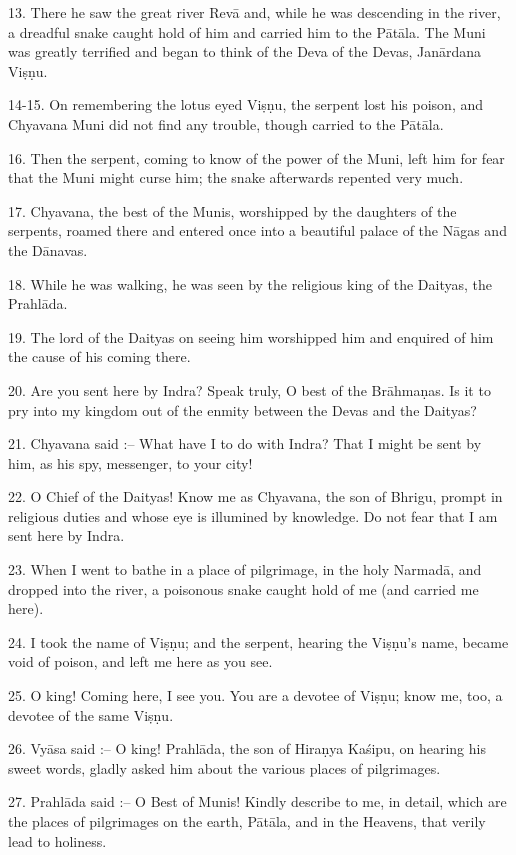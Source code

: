 13. There he saw the great river Rev\=a and, while he was descending in the river, a dreadful snake caught hold of him and carried him to the P\=at\=ala. The Muni was greatly terrified and began to think of the Deva of the Devas, Jan\=ardana Vi\d{s}\d{n}u.

14-15. On remembering the lotus eyed Vi\d{s}\d{n}u, the serpent lost his poison, and Chyavana Muni did not find any trouble, though carried to the P\=at\=ala.

16. Then the serpent, coming to know of the power of the Muni, left him for fear that the Muni might curse him; the snake afterwards repented very much.

17. Chyavana, the best of the Munis, worshipped by the daughters of the serpents, roamed there and entered once into a beautiful palace of the N\=agas and the D\=anavas.

18. While he was walking, he was seen by the religious king of the Daityas, the Prahl\=ada.

19. The lord of the Daityas on seeing him worshipped him and enquired of him the cause of his coming there.

20. Are you sent here by Indra? Speak truly, O best of the Br\=ahma\d{n}as. Is it to pry into my kingdom out of the enmity between the Devas and the Daityas?

21. Chyavana said :-- What have I to do with Indra? That I might be sent by him, as his spy, messenger, to your city!

22. O Chief of the Daityas! Know me as Chyavana, the son of Bhrigu, prompt in religious duties and whose eye is illumined by knowledge. Do not fear that I am sent here by Indra.

23. When I went to bathe in a place of pilgrimage, in the holy Narmad\=a, and dropped into the river, a poisonous snake caught hold of me (and carried me here).

24. I took the name of Vi\d{s}\d{n}u; and the serpent, hearing the Vi\d{s}\d{n}u's name, became void of poison, and left me here as you see.

25. O king! Coming here, I see you. You are a devotee of Vi\d{s}\d{n}u; know me, too, a devotee of the same Vi\d{s}\d{n}u.

26. Vy\=asa said :-- O king! Prahl\=ada, the son of Hira\d{n}ya Ka\'sipu, on hearing his sweet words, gladly asked him about the various places of pilgrimages.

27. Prahl\=ada said :-- O Best of Munis! Kindly describe to me, in detail, which are the places of pilgrimages on the earth, P\=at\=ala, and in the Heavens, that verily lead to holiness.

